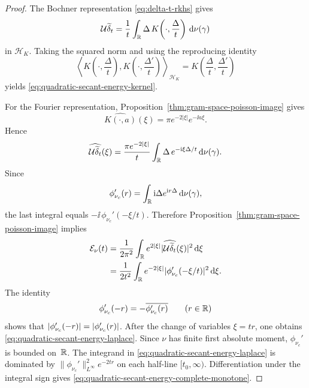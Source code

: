 \begin{proof}
The Bochner representation \eqref{eq:delta-t-rkhs} gives
\[
\mathcal U\widetilde\delta_t
=
\frac{1}{t}\int_{\mathbb{R}}\Delta\,
K\!\left(\cdot,\frac{\Delta}{t}\right)\,\mathrm{d}\nu(\gamma)
\]
in $\mathcal H_K$.  Taking the squared norm and using the reproducing
identity
\[
\left\langle
K\!\left(\cdot,\frac{\Delta}{t}\right),
K\!\left(\cdot,\frac{\Delta'}{t}\right)
\right\rangle_{\mathcal H_K}
=
K\!\left(\frac{\Delta}{t},\frac{\Delta'}{t}\right)
\]
yields \eqref{eq:quadratic-secant-energy-kernel}.

For the Fourier representation, Proposition~\ref{thm:gram-space-poisson-image}
gives
\[
\widehat{K(\cdot,a)}(\xi)=\pi e^{-2|\xi|}e^{-\ii a\xi}.
\]
Hence
\[
\widehat{\mathcal U\widetilde\delta_t}(\xi)
=
\frac{\pi e^{-2|\xi|}}{t}
\int_{\mathbb{R}}\Delta\,e^{-\mathrm{i} \xi\Delta/t}\,\mathrm{d}\nu(\gamma).
\]
Since
\[
\phi_{\nu_c}'(r)
=\int_{\mathbb{R}}\mathrm{i}\Delta e^{\mathrm{i} r\Delta}\,\mathrm{d}\nu(\gamma),
\]
the last integral equals $-\ii\,\phi_{\nu_c}'(-\xi/t)$.  Therefore
Proposition~\ref{thm:gram-space-poisson-image} implies
\begin{align*}
\mathcal E_\nu(t)
&=
\frac{1}{2\pi^2}\int_{\mathbb{R}}e^{2|\xi|}
\lvert \widehat{\mathcal U\widetilde\delta_t}(\xi)\rvert^2\,\mathrm{d}\xi \\
&=
\frac{1}{2t^2}\int_{\mathbb{R}}e^{-2|\xi|}
\lvert \phi_{\nu_c}'(-\xi/t)\rvert^2\,\mathrm{d}\xi.
\end{align*}
The identity
\[
\phi_{\nu_c}'(-r)=-\overline{\phi_{\nu_c}'(r)}
\qquad(r\in\mathbb{R})
\]
shows that
$\lvert \phi_{\nu_c}'(-r)\rvert=\lvert \phi_{\nu_c}'(r)\rvert$.  After the change of
variables $\xi=tr$, one obtains
\eqref{eq:quadratic-secant-energy-laplace}.
Since $\nu$ has finite first absolute moment, $\phi_{\nu_c}'$ is bounded on~$\mathbb{R}$.
The integrand in \eqref{eq:quadratic-secant-energy-laplace} is dominated by
$\|\phi_{\nu_c}'\|_{L^\infty}^2 e^{-2tr}$ on each half-line $[t_0,\infty)$.
Differentiation under the integral sign gives \eqref{eq:quadratic-secant-energy-complete-monotone}.
\end{proof}

